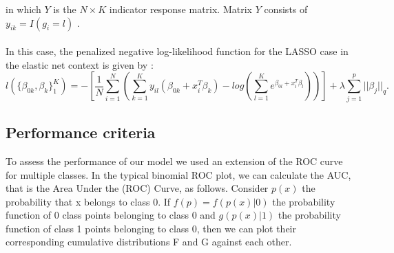     in which $Y$ is the $N\times K$ indicator response matrix. 
    Matrix $Y$ consists of $y_{ik}=I(g_i=l)$ \parencite{Friedman_2010}. 
    \\\\
    In this case, the penalized negative log-likelihood 
    function for the LASSO case in the elastic net context is given by 
    \parencite{hastie2016introduction}:
    \begin{equation}
        l(\{\beta_{0k},\beta_k\}_1^K)=
        -\left[ 
            \frac{1}{N} \sum_{i=1}^N\left( 
                \sum_{k=1}^Ky_{il}(\beta_{0k}+x_i^T\beta_k)-
                log\left(
                    \sum_{l=1}^K e^{\beta_{0l}+x_i^T\beta_l}
                \right)
            \right)
        \right] + \lambda \sum_{j=1}^p ||\beta_j||_q.  
    \end{equation}


\subsection{Performance criteria}
    To assess the performance of our model we used an extension of 
    the ROC curve for multiple classes. In the typical binomial ROC 
    plot, we can calculate the AUC, that is the Area Under the (ROC) 
    Curve, as follows. Consider $p(x)$ the probability that x belongs 
    to class 0. If $f(p)=f(p(x)|0)$ the probability function of 0 
    class points belonging to class 0 and $g(p(x)|1)$ the probability 
    function of class 1 points belonging to class 0, then we can plot 
    their corresponding cumulative distributions F and G against each 
    other.
    

